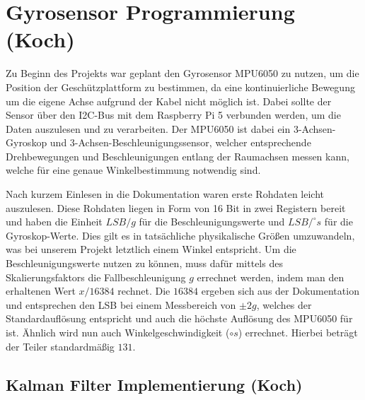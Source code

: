 \section{Gyrosensor Programmierung (Koch)}
Zu Beginn des Projekts war geplant den Gyrosensor MPU6050 zu nutzen, um die Position der Geschützplattform zu bestimmen, da eine kontinuierliche Bewegung um die eigene Achse aufgrund der Kabel nicht möglich ist. Dabei sollte der Sensor über den I2C-Bus mit dem Raspberry Pi 5 verbunden werden, um die Daten auszulesen und zu verarbeiten.
Der MPU6050 ist dabei ein 3-Achsen-Gyroskop und 3-Achsen-Beschleunigungssensor, welcher entsprechende Drehbewegungen und Beschleunigungen entlang der Raumachsen messen kann, welche für eine genaue Winkelbestimmung notwendig sind.

Nach kurzem Einlesen in die Dokumentation waren erste Rohdaten leicht auszulesen. Diese Rohdaten liegen in Form von 16 Bit in zwei Registern bereit und haben die Einheit $\mathit{LSB/g}$ für die Beschleunigungswerte und $\mathit{LSB/^\circ s}$ für die Gyroskop-Werte. Dies gilt es in tatsächliche physikalische Größen umzuwandeln, was bei unserem Projekt letztlich einem Winkel entspricht. 
Um die Beschleunigungswerte nutzen zu können, muss dafür mittels des Skalierungsfaktors die Fallbeschleunigung $\mathit{g}$ errechnet werden, indem man den erhaltenen Wert $x/16384$ rechnet. Die $16384$ ergeben sich aus der Dokumentation und entsprechen den LSB bei einem Messbereich von $\pm2g$, welches der Standardauflösung entspricht und auch die höchste Auflösung des MPU6050 für ist.
Ähnlich wird nun auch Winkelgeschwindigkeit ($\mathit{\circ s}$) errechnet. Hierbei beträgt der Teiler standardmäßig $131$. 

\subsection{Kalman Filter Implementierung (Koch)}